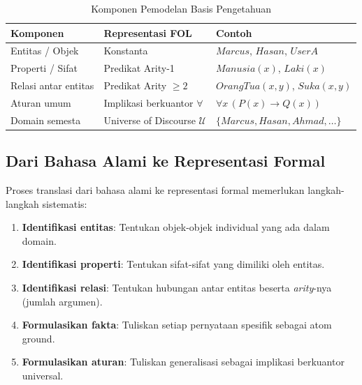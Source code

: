 \begin{table}[htbp]
\centering
\renewcommand{\arraystretch}{1.3}
\begin{tabular}{|p{3cm}|p{4cm}|p{5cm}|}
\hline
\textbf{Komponen} & \textbf{Representasi FOL} & \textbf{Contoh} \\ \hline
Entitas / Objek & Konstanta & $Marcus$, $Hasan$, $UserA$ \\ \hline
Properti / Sifat & Predikat Arity-1 & $Manusia(x)$, $Laki(x)$ \\ \hline
Relasi antar entitas & Predikat Arity $\geq 2$ & $OrangTua(x,y)$, $Suka(x,y)$ \\ \hline
Aturan umum & Implikasi berkuantor $\forall$ & $\forall x\, (P(x) \rightarrow Q(x))$ \\ \hline
Domain semesta & Universe of Discourse $\mathcal{U}$ & $\{Marcus, Hasan, Ahmad, \ldots\}$ \\ \hline
\end{tabular}
\caption{Komponen Pemodelan Basis Pengetahuan}
\label{tab:komponen-kb}
\end{table}

\subsection{Dari Bahasa Alami ke Representasi Formal}

Proses translasi dari bahasa alami ke representasi formal memerlukan langkah-langkah sistematis:

\begin{enumerate}
    \item \textbf{Identifikasi entitas}: Tentukan objek-objek individual yang ada dalam domain.
    \item \textbf{Identifikasi properti}: Tentukan sifat-sifat yang dimiliki oleh entitas.
    \item \textbf{Identifikasi relasi}: Tentukan hubungan antar entitas beserta \textit{arity}-nya (jumlah argumen).
    \item \textbf{Formulasikan fakta}: Tuliskan setiap pernyataan spesifik sebagai atom ground.
    \item \textbf{Formulasikan aturan}: Tuliskan generalisasi sebagai implikasi berkuantor universal.
\end{enumerate}

